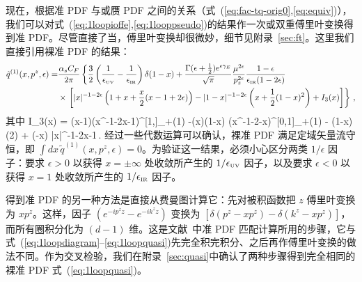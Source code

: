 \begin{widetext}
现在，根据准 PDF 与\spcorr 或赝 PDF 之间的关系（式~(\ref{eq:fac-tq-orig0},\ref{eq:equiv})），我们可以对式~(\ref{eq:1loopioffe},\ref{eq:1looppseudo})的结果作一次或双重傅里叶变换得到准 PDF。尽管直接了当，傅里叶变换却很微妙，细节见附录~\ref{sec:ft}。这里我们直接引用裸准 PDF 的结果：
\begin{align}  \label{eq:1loopquasi}
\tilde{q}^{(1)}(x,p^z,\epsilon)
	=& {\alpha_sC_F\over 2\pi}\left\{{3\over2}\left({1\over \epsilon_{\mbox{\tiny UV}}}-{1\over \epsilon_{\mbox{\tiny IR}}}\right)\delta(1-x) + {\Gamma(\epsilon+{1\over2})e^{\epsilon\gamma_E}\over \sqrt{\pi}}{\mu^{2\epsilon}\over p_z^{2\epsilon}}{1-\epsilon \over \epsilon_{\mbox{\tiny IR}} (1-2\epsilon)} \right.\\
	&\times\left.\left[|x|^{-1-2\epsilon}\left(1+x+{x\over2}(x-1+2\epsilon)\right)-  |1-x|^{-1-2\epsilon}\left(x+{1\over2}(1-x)^2\right) + I_3(x)\right] \right\}\,,\nonumber
\end{align}
其中
\beq
	I_3(x) = \theta(x-1)\left(x^{-1-2\epsilon}\over x-1\right)^{[1,\infty]}_{+(1)} -\theta(x)\theta(1-x) \left(x^{-1-2\epsilon}-x\right)^{[0,1]}_{+(1)} - \delta(1-x) \pi\csc(2\pi\epsilon) + \theta(-x) {|x|^{-1-2\epsilon}\over x-1}\,.
\eeq
经过一些代数运算可以确认，裸准 PDF 满足定域矢量流守恒，即 $\int\! dx\, \tilde{q}^{(1)}(x,p^z,\epsilon) = 0$。为验证这一结果，必须小心区分两类 $1/\epsilon$ 因子：要求 $\epsilon>0$ 以获得 $x=\pm \infty$ 处收敛所产生的 $1/\epsilon_{\mbox{\tiny UV}}$ 因子，以及要求 $\epsilon<0$ 以获得 $x=1$ 处收敛所产生的 $1/\epsilon_{\mbox{\tiny IR}}$ 因子。

得到准 PDF 的另一种方法是直接从费曼图计算它：先对被积函数把 $z$ 傅里叶变换为 $xp^z$。这样，因子 $(e^{-ip^z z}- e^{-ik^z z})$ 变换为 $[\delta(p^z-xp^z)-\delta(k^z-xp^z)]$，而所有圈积分化为 $(d-1)$ 维。这是文献~\cite{Xiong:2013bka,Stewart:2017tvs,Wang:2017qyg}中准 PDF 匹配计算所用的步骤，它与式~(\ref{eq:1loopdiagram}--\ref{eq:1loopquasi})先完全积完积分、之后再作傅里叶变换的做法不同。作为交叉检验，我们在附录~\ref{sec:quasi}中确认了两种步骤得到完全相同的裸准 PDF 式~(\ref{eq:1loopquasi})。


\end{widetext}
